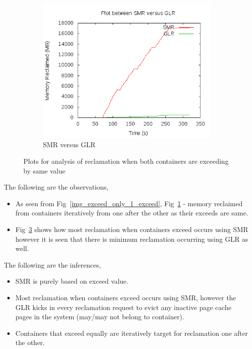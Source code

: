 \begin{figure}[t!]
\begin{subfigure}[t]{0.48\textwidth}
	      \label{img_exceed_only_1_smr}
	    \end{subfigure}
	    ~ 
	    \begin{subfigure}[t]{0.48\textwidth}
	      \centering
	      \includegraphics[width=1\textwidth]{images/controller_issues/exceed_only/compare.png}
	      \caption{SMR versus GLR}
	    \label{img_exceed_only_1_compare}
	    \end{subfigure}
	    \caption{Plots for analysis of reclamation when both containers are exceeding by same value}
	  \end{figure}
	  
	    The following are the observations,
	    \begin{itemize}
	      \item As seen from Fig~\ref{img_exceed_only_1_exceed}, Fig~\ref{img_exceed_only_1_smr} - memory reclaimed from containers 
  iteratively from one after the other as their exceeds are same.
	      \item Fig~\ref{img_exceed_only_1_compare} shows how most reclamation when containers exceed occurs using SMR however it is seen 
  that there is minimum reclamation occurring using GLR as well.
	    \end{itemize}

	    The following are the inferences,
	    \begin{itemize}
	      \item SMR is purely based on exceed value.
	      \item Most reclamation when containers exceed occurs using SMR, however the GLR kicks in every reclamation request to evict any 
  inactive page cache pages in the system (may/may not belong to container).
	      \item Containers that exceed equally are iteratively target for reclamation one after the other.
	    \end{itemize}
      
